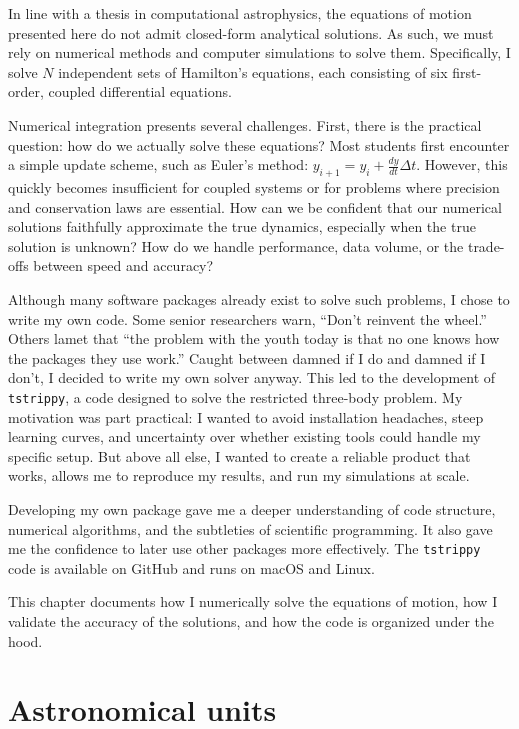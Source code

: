 In line with a thesis in computational astrophysics, the equations of motion presented here do not admit closed-form analytical solutions. As such, we must rely on numerical methods and computer simulations to solve them. Specifically, I solve $N$ independent sets of Hamilton's equations, each consisting of six first-order, coupled differential equations.

Numerical integration presents several challenges. First, there is the practical question: how do we actually solve these equations? Most students first encounter a simple update scheme, such as Euler's method: $y_{i+1} = y_i + \frac{dy}{dt}\Delta t$. However, this quickly becomes insufficient for coupled systems or for problems where precision and conservation laws are essential. How can we be confident that our numerical solutions faithfully approximate the true dynamics, especially when the true solution is unknown? How do we handle performance, data volume, or the trade-offs between speed and accuracy?

Although many software packages already exist to solve such problems, I chose to write my own code. Some senior researchers warn, ``Don't reinvent the wheel.'' Others lamet that ``the problem with the youth today is that no one knows how the packages they use work.'' Caught between damned if I do and damned if I don't, I decided to write my own solver anyway. This led to the development of \texttt{tstrippy}, a code designed to solve the restricted three-body problem. My motivation was part practical: I wanted to avoid installation headaches, steep learning curves, and uncertainty over whether existing tools could handle my specific setup. But above all else, I wanted to create a reliable product that works, allows me to reproduce my results, and run my simulations at scale. 

Developing my own package gave me a deeper understanding of code structure, numerical algorithms, and the subtleties of scientific programming. It also gave me the confidence to later use other packages more effectively. The \texttt{tstrippy} code is available on GitHub and runs on macOS and Linux.

This chapter documents how I numerically solve the equations of motion, how I validate the accuracy of the solutions, and how the code is organized under the hood.



\section{Astronomical units}

